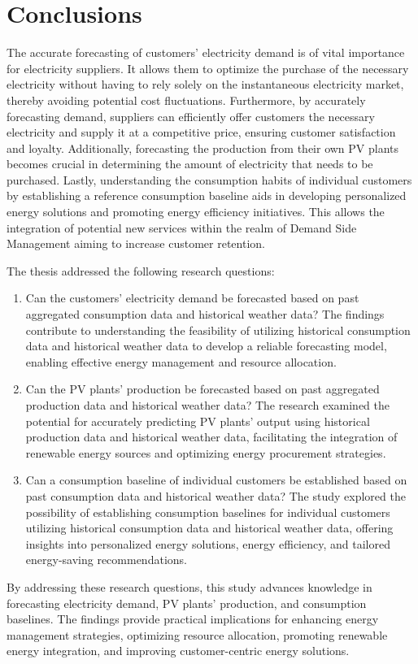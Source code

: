 \chapter{Conclusions}
\label{cha:conclusions}
\vspace{0.4 cm}

The accurate forecasting of customers' electricity demand is of vital importance for electricity suppliers.
It allows them to optimize the purchase of the necessary electricity without having to rely solely on the instantaneous electricity market, thereby avoiding potential cost fluctuations.
Furthermore, by accurately forecasting demand, suppliers can efficiently offer customers the necessary electricity and supply it at a competitive price, ensuring customer satisfaction and loyalty.
Additionally, forecasting the production from their own PV plants becomes crucial in determining the amount of electricity that needs to be purchased.
Lastly, understanding the consumption habits of individual customers by establishing a reference consumption baseline aids in developing personalized energy solutions and promoting energy efficiency initiatives.
This allows the integration of potential new services within the realm of Demand Side Management aiming to increase customer retention.

The thesis addressed the following research questions:
\begin{enumerate}
  \item Can the customers' electricity demand be forecasted based on past aggregated consumption data and historical weather data? The findings contribute to understanding the feasibility of utilizing historical consumption data and historical weather data to develop a reliable forecasting model, enabling effective energy management and resource allocation.
  \item Can the PV plants' production be forecasted based on past aggregated production data and historical weather data? The research examined the potential for accurately predicting PV plants' output using historical production data and historical weather data, facilitating the integration of renewable energy sources and optimizing energy procurement strategies.
  \item Can a consumption baseline of individual customers be established based on past consumption data and historical weather data? The study explored the possibility of establishing consumption baselines for individual customers utilizing historical consumption data and historical weather data, offering insights into personalized energy solutions, energy efficiency, and tailored energy-saving recommendations.
\end{enumerate}
By addressing these research questions, this study advances knowledge in forecasting electricity demand, PV plants' production, and consumption baselines.
The findings provide practical implications for enhancing energy management strategies, optimizing resource allocation, promoting renewable energy integration, and improving customer-centric energy solutions.

